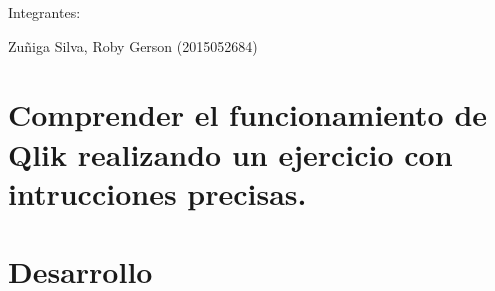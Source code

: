 \documentclass[preprint,12pt]{elsarticle}
\begin{document}
\begin{titlepage}
\begin{center}
\vspace*{0.2in}
\vspace*{0.1in}
\begin{large}
Integrantes: \\
\begin{flushleft}


Zuñiga Silva, Roby Gerson  	           \hfill	(2015052684) \\


\end{flushleft}
\end{large}
\end{center}

\end{titlepage}

\section{Comprender el funcionamiento de Qlik realizando un ejercicio con intrucciones precisas.}
	


\section{Desarrollo}
\end{document}
